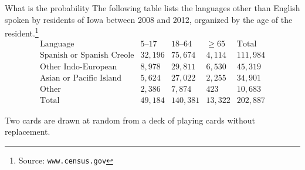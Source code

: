 \documentclass[answers,addpoints,12pt]{exam}
\begin{document}
\begin{questions}
\question What is the probability
The following table lists
the languages other than English spoken by residents
of Iowa between 2008 and 2012, organized by the age
of the resident.\footnote{Source: {\tt www.census.gov}}
\[\begin{array}{r|rrr|r}
\text{Language}&\text{$5$--$17$}
&\text{$18$--$64$}&\ge 65&\text{Total}\\\hline
\text{Spanish or Spanish Creole}&32,196&75,674&4,114&111,984\\
\text{Other Indo-European}&8,978&29,811&6,530&45,319\\
\text{Asian or Pacific Island}&5,624&27,022&2,255&34,901\\
\text{Other}&2,386&7,874&423&10,683\\\hline
\text{Total}&49,184&140,381&13,322&202,887
\end{array}\]

\question Two cards are drawn at random from a deck of playing cards
without replacement.
\begin{solution}
\begin{parts}

\end{parts}
\end{solution}
\end{questions}
\end{document}
